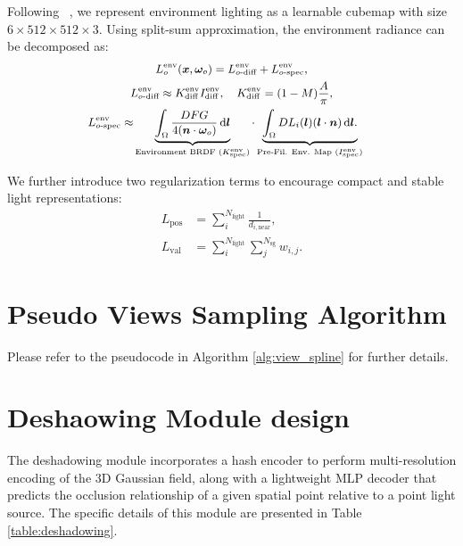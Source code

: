 Following ~\cite{liang2024gs}, we represent environment lighting as a learnable cubemap with size $6 \times 512 \times 512 \times 3$. Using split-sum approximation, the environment radiance can be decomposed as:
\begin{equation}
\small
\begin{gathered}
\label{eq:env_diff_spec_approx}
L^\text{env}_{o}(\bm{x}, \bm{\omega}_o) =
L^\text{env}_{o\text{-diff}} + L^\text{env}_{o\text{-spec}},\\
L^\text{env}_{o\text{-diff}} \approx K^\text{env}_\text{diff} I^\text{env}_\text{diff},\quad
K^\text{env}_\text{diff} = (1 - M) \frac{A}{\pi},\\
\begin{aligned}
L^\text{env}_{o\text{-spec}}
\approx& \underbrace{
\int_{\Omega} \frac{DFG}{4 (\bm{n} \cdot \bm{\omega}_o)} \, \text{d}\bm{l}
}_{
\text{Environment BRDF }(K^\text{env}_\text{spec})
}
\cdot\underbrace{
\int_{\Omega} 
DL_i(\bm{l}) (\bm{l} \cdot \bm{n}) \, \text{d}\bm{l}.
}_{
\text{Pre-Fil. Env. Map }(I^\text{env}_\text{spec})
}
\end{aligned}
\end{gathered}
\vspace{-0.1cm}
\end{equation}





We further introduce two regularization terms to encourage compact and stable light representations:
\begin{align}
    L_{\text{pos}} &= \sum_{i}^{N_{\text{light}}} \frac{1}{d_{i,\text{near}}}, \\
    L_{\text{val}} &= \sum_{i}^{N_{\text{light}}} \sum_{j}^{N_{\text{sg}}} w_{i,j}.
\end{align}

\section{Pseudo Views Sampling Algorithm}
Please refer to the pseudocode in Algorithm \ref{alg:view_spline} for further details.

\section{Deshaowing Module design}
The deshadowing module incorporates a hash encoder to perform multi-resolution encoding of the 3D Gaussian field, along with a lightweight MLP decoder that predicts the occlusion relationship of a given spatial point relative to a point light source. The specific details of this module are presented in Table \ref{table:deshadowing}.

